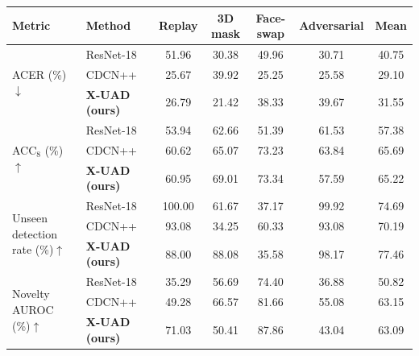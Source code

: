 \begin{tabular}{llccccc}
\toprule
Metric & Method & Replay & 3D mask & Face-swap & Adversarial & Mean \\
\midrule
\multirow{3}{*}{ACER (\%)$\downarrow$} & ResNet-18~\cite{he2016resnet} & 51.96 & 30.38 & 49.96 & 30.71 & 40.75 \\
 & CDCN++~\cite{yu2020cdcn} & 25.67 & 39.92 & 25.25 & 25.58 & 29.10 \\
 & \textbf{X-UAD (ours)} & 26.79 & 21.42 & 38.33 & 39.67 & 31.55 \\
\midrule
\multirow{3}{*}{ACC$_8$ (\%)$\uparrow$} & ResNet-18~\cite{he2016resnet} & 53.94 & 62.66 & 51.39 & 61.53 & 57.38 \\
 & CDCN++~\cite{yu2020cdcn} & 60.62 & 65.07 & 73.23 & 63.84 & 65.69 \\
 & \textbf{X-UAD (ours)} & 60.95 & 69.01 & 73.34 & 57.59 & 65.22 \\
\midrule
\multirow{3}{*}{Unseen detection rate (\%)$\uparrow$} & ResNet-18~\cite{he2016resnet} & 100.00 & 61.67 & 37.17 & 99.92 & 74.69 \\
 & CDCN++~\cite{yu2020cdcn} & 93.08 & 34.25 & 60.33 & 93.08 & 70.19 \\
 & \textbf{X-UAD (ours)} & 88.00 & 88.08 & 35.58 & 98.17 & 77.46 \\
\midrule
\multirow{3}{*}{Novelty AUROC (\%)$\uparrow$} & ResNet-18~\cite{he2016resnet} & 35.29 & 56.69 & 74.40 & 36.88 & 50.82 \\
 & CDCN++~\cite{yu2020cdcn} & 49.28 & 66.57 & 81.66 & 55.08 & 63.15 \\
 & \textbf{X-UAD (ours)} & 71.03 & 50.41 & 87.86 & 43.04 & 63.09 \\
\bottomrule
\end{tabular}